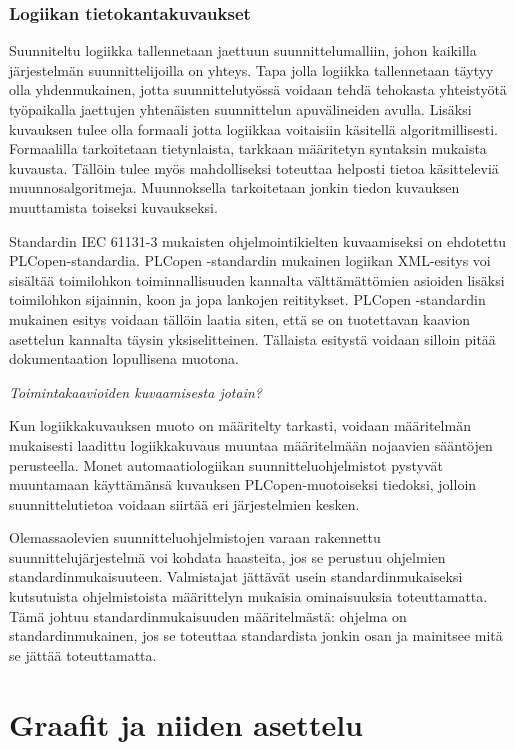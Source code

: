 \documentclass[finnish,12pt]{article}
\begin{document}
		\subsubsection{Logiikan tietokantakuvaukset}

Suunniteltu logiikka tallennetaan jaettuun suunnittelumalliin, johon kaikilla järjestelmän suunnittelijoilla on yhteys.
Tapa jolla logiikka tallennetaan täytyy olla yhdenmukainen, jotta suunnittelutyössä voidaan tehdä tehokasta yhteistyötä työpaikalla jaettujen yhtenäisten suunnittelun apuvälineiden avulla.
Lisäksi kuvauksen tulee olla formaali jotta logiikkaa voitaisiin käsitellä algoritmillisesti.
Formaalilla tarkoitetaan tietynlaista, tarkkaan määritetyn syntaksin mukaista kuvausta.
Tällöin tulee myös mahdolliseksi toteuttaa helposti tietoa käsitteleviä muunnosalgoritmeja.
Muunnoksella tarkoitetaan jonkin tiedon kuvauksen muuttamista toiseksi kuvaukseksi.

Standardin IEC 61131-3 mukaisten ohjelmointikielten kuvaamiseksi on ehdotettu PLCopen-standardia.
PLCopen -standardin mukainen logiikan XML-esitys voi sisältää toimilohkon toiminnallisuuden kannalta välttämättömien asioiden lisäksi toimilohkon sijainnin, koon ja jopa lankojen reititykset.
PLCopen -standardin mukainen esitys voidaan tällöin laatia siten, että se on tuotettavan kaavion asettelun kannalta täysin yksiselitteinen.
Tällaista esitystä voidaan silloin pitää dokumentaation lopullisena muotona.

\emph{Toimintakaavioiden kuvaamisesta jotain?}

Kun logiikkakuvauksen muoto on määritelty tarkasti, voidaan määritelmän mukaisesti laadittu logiikkakuvaus muuntaa määritelmään nojaavien sääntöjen perusteella.
Monet automaatiologiikan suunnitteluohjelmistot pystyvät muuntamaan käyttämänsä kuvauksen PLCopen-muotoiseksi tiedoksi, jolloin suunnittelutietoa voidaan siirtää eri järjestelmien kesken.

Olemassaolevien suunnitteluohjelmistojen varaan rakennettu suunnittelujärjestelmä voi kohdata haasteita, jos se perustuu ohjelmien standardinmukaisuuteen.
Valmistajat jättävät usein standardinmukaiseksi kutsutuista ohjelmistoista määrittelyn mukaisia ominaisuuksia toteuttamatta.\cite{RefWorks:42}
Tämä johtuu standardinmukaisuuden määritelmästä: ohjelma on standardinmukainen, jos se toteuttaa standardista jonkin osan ja mainitsee mitä se jättää toteuttamatta. 

	\clearpage

	
	\section{Graafit ja niiden asettelu}
\end{document}
